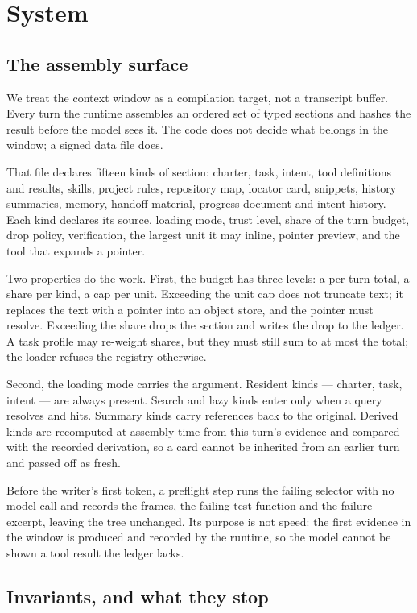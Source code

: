 \section{System}

\subsection{The assembly surface}

We treat the context window as a compilation target, not a transcript buffer.
Every turn the runtime assembles an ordered set of typed sections and hashes the
result before the model sees it. The code does not decide what belongs in the
window; a signed data file does.

That file declares fifteen kinds of section: charter, task, intent, tool
definitions and results, skills, project rules, repository map, locator card,
snippets, history summaries, memory, handoff material, progress document and
intent history. Each kind declares its source, loading mode, trust level, share
of the turn budget, drop policy, verification, the largest unit it may inline,
pointer preview, and the tool that expands a pointer.

Two properties do the work. First, the budget has three levels: a per-turn
total, a share per kind, a cap per unit. Exceeding the unit cap does not
truncate text; it replaces the text with a pointer into an object store, and
the pointer must resolve. Exceeding the share drops the section and writes the
drop to the ledger. A task profile may re-weight shares, but they must still
sum to at most the total; the loader refuses the registry otherwise.

Second, the loading mode carries the argument. Resident kinds --- charter, task,
intent --- are always present. Search and lazy kinds enter only when a query
resolves and hits. Summary kinds carry references back to the original. Derived
kinds are recomputed at assembly time from this turn's evidence and compared
with the recorded derivation, so a card cannot be inherited from an earlier
turn and passed off as fresh.

Before the writer's first token, a preflight step runs the failing selector with
no model call and records the frames, the failing test function and the failure
excerpt, leaving the tree unchanged. Its purpose is not speed: the first
evidence in the window is produced and recorded by the runtime, so the model
cannot be shown a tool result the ledger lacks.

\subsection{Invariants, and what they stop}

